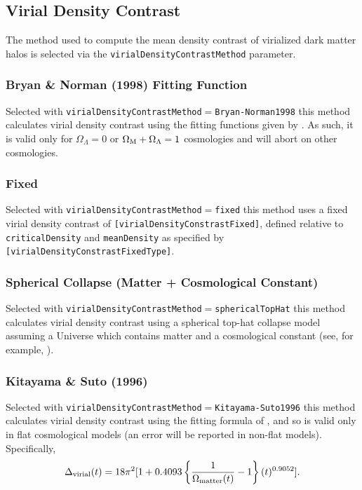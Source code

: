 \subsection{Virial Density Contrast}\label{sec:VirialDensityConstrast}

The method used to compute the mean density contrast of virialized dark matter halos is selected via the {\tt virialDensityContrastMethod} parameter.

\subsubsection{Bryan \& Norman (1998) Fitting Function}

Selected with {\tt virialDensityContrastMethod}$=${\tt Bryan-Norman1998} this method calculates virial density contrast using the fitting functions given by \cite{bryan_statistical_1998}. As such, it is valid only for $\Omega_\Lambda=0$ or $\Omega_{\rm M}+\Omega_\Lambda=1$ cosmologies and will abort on other cosmologies.

\subsubsection{Fixed}

Selected with {\tt virialDensityContrastMethod}$=${\tt fixed} this method uses a fixed virial density contrast of {\tt [virialDensityConstrastFixed]}, defined relative to {\tt criticalDensity} and {\tt meanDensity} as specified by {\tt [virialDensityConstrastFixedType]}.

\subsubsection{Spherical Collapse (Matter + Cosmological Constant)}

Selected with {\tt virialDensityContrastMethod}$=${\tt sphericalTopHat} this method calculates virial density contrast using a spherical top-hat collapse model assuming a Universe which contains matter and a cosmological constant (see, for example, \citealt{percival_cosmological_2005}).

\subsubsection{Kitayama \& Suto (1996)}

Selected with {\tt virialDensityContrastMethod}$=${\tt Kitayama-Suto1996} this method calculates virial density contrast using the fitting formula of \cite{kitayama_semianalytic_1996}, and so is valid only in flat cosmological models (an error will be reported in non-flat models). Specifically,
\begin{equation}
 \Delta_{\rm virial}(t) = 18 \pi^2 [1+0.4093 \left\{{1\over \Omega_{\rm matter}(t)}-1\right\}(t)^{0.9052}].
\end{equation}

